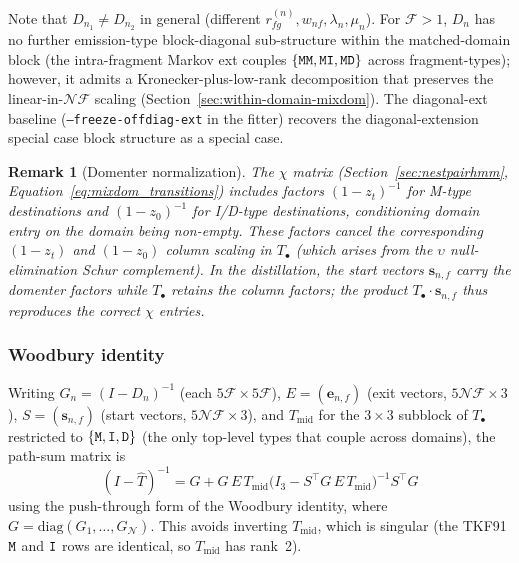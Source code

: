 \documentclass{article}
\newtheorem{remark}{Remark}
\newcommand\insrate{\lambda}
\newcommand\delrate{\mu}
\newcommand\ext{r}
\newcommand\dom{n}
\newcommand\ndom{\mathcal{N}}
\newcommand\nfrag{\mathcal{F}}
\newcommand\fragdist{w}
\newcommand\evoltime{t}
\newcommand\exptrans{\upsilon}
\newcommand\transnest{\chi}
\newcommand\emptyseg{z}
\newcommand\nonemptytrans{T}
\newcommand\mat{{\tt M}}
\newcommand\ins{{\tt I}}
\newcommand\del{{\tt D}}
\newcommand\effT{\hat{T}}
\newcommand\frag{f}
\newcommand\srcfrag{f}
\newcommand\destfrag{g}
\begin{document}
Note that $D_{\dom_1} \neq D_{\dom_2}$ in general (different
$\ext^{(\dom)}_{\srcfrag\destfrag}, \fragdist_{\dom\frag}, \insrate_\dom,
\delrate_\dom$). For $\nfrag > 1$, $D_\dom$ has no further
emission-type block-diagonal sub-structure within the matched-domain
block (the intra-fragment Markov ext couples
$\{\mat\mat, \mat\ins, \mat\del\}$ across fragment-types); however, it
admits a Kronecker-plus-low-rank decomposition that preserves the
linear-in-$\ndom\nfrag$ scaling
(Section~\ref{sec:within-domain-mixdom}). The diagonal-ext baseline
(\texttt{--freeze-offdiag-ext} in the fitter) recovers the diagonal-extension special case
block structure as a special case.

\begin{remark}[Domenter normalization]
The $\transnest$ matrix (Section~\ref{sec:nestpairhmm},
Equation~\ref{eq:mixdom_transitions}) includes factors
$(1-\emptyseg_\evoltime)^{-1}$ for M-type destinations and
$(1-\emptyseg_0)^{-1}$ for I/D-type destinations, conditioning domain
entry on the domain being non-empty. These factors cancel the
corresponding $(1-\emptyseg_\evoltime)$ and $(1-\emptyseg_0)$ column
scaling in $\nonemptytrans_\bullet$ (which arises from the $\exptrans$
null-elimination Schur complement). In the distillation, the start
vectors $\mathbf{s}_{\dom,\frag}$ carry the domenter factors while
$\nonemptytrans_\bullet$ retains the column factors; the product
$\nonemptytrans_\bullet \cdot \mathbf{s}_{\dom,\frag}$ thus reproduces
the correct $\transnest$ entries.
\end{remark}

\subsubsection{Woodbury identity}

Writing $G_\dom = (I-D_\dom)^{-1}$ (each $5\nfrag \times 5\nfrag$),
$E = (\mathbf{e}_{\dom,\frag})$ (exit vectors, $5\ndom\nfrag \times 3$),
$S = (\mathbf{s}_{\dom,\frag})$ (start vectors, $5\ndom\nfrag \times 3$),
and $\nonemptytrans_\text{mid}$ for the $3\times 3$ subblock of
$\nonemptytrans_\bullet$ restricted to $\{\mat,\ins,\del\}$ (the only
top-level types that couple across domains), the path-sum matrix is
\[
(I - \effT)^{-1}
= G + G\,E\,\nonemptytrans_\text{mid}
  \bigl(I_3 - S^\top G\,E\,\nonemptytrans_\text{mid}\bigr)^{-1}
  S^\top G
\]
using the push-through form of the Woodbury identity, where
$G = \mathrm{diag}(G_1, \ldots, G_\ndom)$.
This avoids inverting $\nonemptytrans_\text{mid}$, which is singular
(the TKF91 $\mat$ and $\ins$ rows are identical, so
$\nonemptytrans_\text{mid}$ has rank~2).
\end{document}
